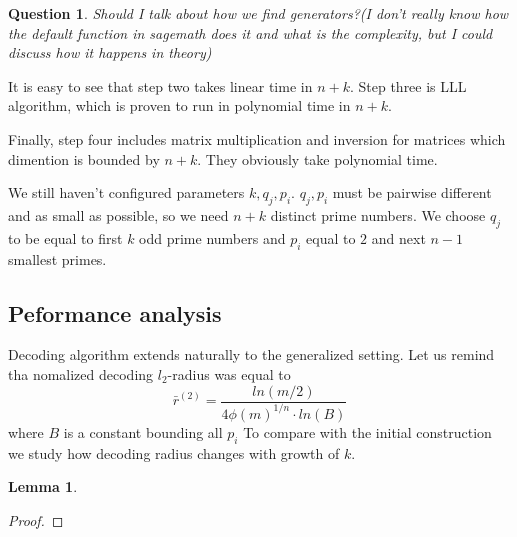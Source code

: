 \documentclass[12pt]{article}
\newtheorem{question}{Question}
\newtheorem{lemma}{Lemma}
\begin{document}
\begin{question}
    Should I talk about how we find generators?(I don't really know how the default function in sagemath does it and what is the complexity, but I could discuss how it happens in theory)
\end{question}

It is easy to see that step two takes linear time in $n + k$. Step three is LLL algorithm, which is proven to run in polynomial time in $n + k$.

Finally, step four includes matrix multiplication and inversion for matrices which dimention is bounded by $n + k$. They obviously take polynomial time.

We still haven't configured parameters $k, q_{j}, p_{i}$. $q_{j}, p_{i}$ must be pairwise different and as small as possible, so we need $n+k$ distinct prime numbers. We choose $q_{j}$ to be equal to first $k$ odd prime numbers and $p_{i}$ equal to $2$ and next $n-1$ smallest primes.
\subsection{Peformance analysis}
Decoding algorithm extends naturally to the generalized setting. Let us remind tha nomalized decoding $l_{2}$-radius was equal to
\begin{equation}
    \bar r^{(2)} = \frac{ln(m/2)}{4 \phi(m)^{1/n} \cdot ln(B)}
\end{equation}
where $B$ is a constant bounding all $p_{i}$
To compare with the initial construction we study how decoding radius changes with growth of $k$.

\begin{lemma}

\end{lemma}
\begin{proof}

\end{proof}
\end{document}

